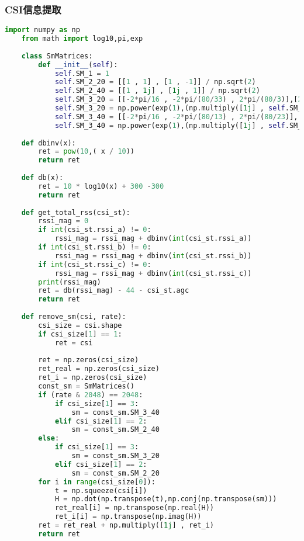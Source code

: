 \documentclass[UTF8]{article}
\begin{document}
\subsubsection{CSI信息提取}
\begin{lstlisting}[language=Python, caption=$ get\_scaled\_csi.py $]
    import numpy as np
    from math import log10,pi,exp
    
    class SmMatrices:
        def __init__(self):
            self.SM_1 = 1
            self.SM_2_20 = [[1 , 1] , [1 , -1]] / np.sqrt(2)
            self.SM_2_40 = [[1 , 1j] , [1j , 1]] / np.sqrt(2)
            self.SM_3_20 = [[-2*pi/16 , -2*pi/(80/33) , 2*pi/(80/3)],[2*pi/(80/23) , 2*pi/(48/13) , 2*pi/(240/13)],[-2*pi/(80/13) , 2*pi/(240/37) , 2*pi/(48/13)]]
            self.SM_3_20 = np.power(exp(1),(np.multiply([1j] , self.SM_3_20))).tolist() / np.sqrt(3)
            self.SM_3_40 = [[-2*pi/16 , -2*pi/(80/13) , 2*pi/(80/23)],[-2*pi/(80/37) , -2*pi/(48/11) , -2*pi/(240/107)],[2*pi/(80/7) , -2*pi/(240/83) , -2*pi/(48/11)]]
            self.SM_3_40 = np.power(exp(1),(np.multiply([1j] , self.SM_3_40))).tolist() / np.sqrt(3)
    
    def dbinv(x):
        ret = pow(10,( x / 10))
        return ret
    
    def db(x):
        ret = 10 * log10(x) + 300 -300
        return ret
    
    def get_total_rss(csi_st):
        rssi_mag = 0
        if int(csi_st.rssi_a) != 0:
            rssi_mag = rssi_mag + dbinv(int(csi_st.rssi_a))
        if int(csi_st.rssi_b) != 0:
            rssi_mag = rssi_mag + dbinv(int(csi_st.rssi_b))
        if int(csi_st.rssi_c) != 0:
            rssi_mag = rssi_mag + dbinv(int(csi_st.rssi_c))  
        print(rssi_mag)
        ret = db(rssi_mag) - 44 - csi_st.agc
        return ret
    
    def remove_sm(csi, rate):
        csi_size = csi.shape
        if csi_size[1] == 1:
            ret = csi
    
        ret = np.zeros(csi_size)
        ret_real = np.zeros(csi_size)
        ret_i = np.zeros(csi_size)
        const_sm = SmMatrices()
        if (rate & 2048) == 2048:
            if csi_size[1] == 3:
                sm = const_sm.SM_3_40
            elif csi_size[1] == 2:
                sm = const_sm.SM_2_40
        else:
            if csi_size[1] == 3:
                sm = const_sm.SM_3_20
            elif csi_size[1] == 2:
                sm = const_sm.SM_2_20
        for i in range(csi_size[0]):
            t = np.squeeze(csi[i])
            H = np.dot(np.transpose(t),np.conj(np.transpose(sm)))
            ret_real[i] = np.transpose(np.real(H))
            ret_i[i] = np.transpose(np.imag(H))
        ret = ret_real + np.multiply([1j] , ret_i)
        return ret
        

\end{lstlisting}
\end{document}
